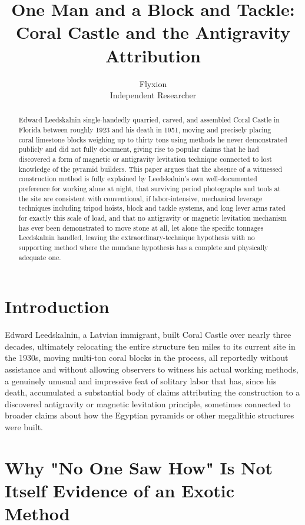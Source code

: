 \documentclass[11pt]{article}
\title{One Man and a Block and Tackle: Coral Castle and the Antigravity Attribution}
\author{Flyxion \\ \small Independent Researcher}
\date{}
\begin{document}
\maketitle

\begin{abstract}
Edward Leedskalnin single-handedly quarried, carved, and assembled Coral Castle in Florida between roughly 1923 and his death in 1951, moving and precisely placing coral limestone blocks weighing up to thirty tons using methods he never demonstrated publicly and did not fully document, giving rise to popular claims that he had discovered a form of magnetic or antigravity levitation technique connected to lost knowledge of the pyramid builders. This paper argues that the absence of a witnessed construction method is fully explained by Leedskalnin's own well-documented preference for working alone at night, that surviving period photographs and tools at the site are consistent with conventional, if labor-intensive, mechanical leverage techniques including tripod hoists, block and tackle systems, and long lever arms rated for exactly this scale of load, and that no antigravity or magnetic levitation mechanism has ever been demonstrated to move stone at all, let alone the specific tonnages Leedskalnin handled, leaving the extraordinary-technique hypothesis with no supporting method where the mundane hypothesis has a complete and physically adequate one.
\end{abstract}

\section{Introduction}

Edward Leedskalnin, a Latvian immigrant, built Coral Castle over nearly three decades, ultimately relocating the entire structure ten miles to its current site in the 1930s, moving multi-ton coral blocks in the process, all reportedly without assistance and without allowing observers to witness his actual working methods, a genuinely unusual and impressive feat of solitary labor that has, since his death, accumulated a substantial body of claims attributing the construction to a discovered antigravity or magnetic levitation principle, sometimes connected to broader claims about how the Egyptian pyramids or other megalithic structures were built.

\section{Why "No One Saw How" Is Not Itself Evidence of an Exotic Method}
\end{document}
